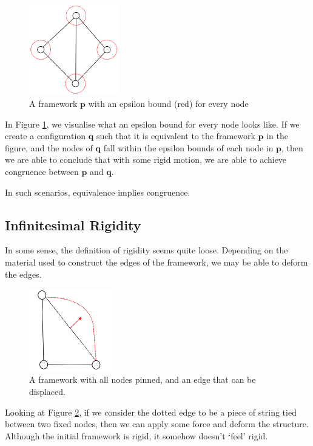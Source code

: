 \begin{figure}[htbp]
    \centering
    \includegraphics[width = 0.35\textwidth]{Chapter 2/14. epsilon.png}
    \caption{A framework $\mathbf{p}$ with an epsilon bound (red) for every node}
    \label{fig: epsilon}
\end{figure}
\vspace{-3mm}
\begin{flushleft}
In Figure \ref{fig: epsilon}, we visualise what an epsilon bound for every node looks like. If we create a configuration $\mathbf{q}$ such that it is equivalent to the framework $\mathbf{p}$ in the figure, and the nodes of $\mathbf{q}$ fall within the epsilon bounds of each node in $\mathbf{p}$, then we are able to conclude that with some rigid motion, we are able to achieve congruence between $\mathbf{p}$ and $\mathbf{q}$. 

In such scenarios, equivalence implies congruence.    
\end{flushleft}

\subsection{Infinitesimal Rigidity}

\begin{flushleft}
In some sense, the definition of rigidity seems quite loose. Depending on the material used to construct the edges of the framework, we may be able to deform the edges. 
\end{flushleft}

\begin{figure}[htbp]
    \centering
    \includegraphics[width = 0.32\textwidth]{Chapter 2/9. not_inf_rigid.png}
    \caption{A framework with all nodes pinned, and an edge that can be displaced.}
    \label{fig: not_inf_rigid}
\end{figure}
\vspace{-2 mm}
\begin{flushleft}
Looking at Figure \ref{fig: not_inf_rigid}, if we consider the dotted edge to be a piece of string tied between two fixed nodes, then we can apply some force and deform the structure. Although the initial framework is rigid, it somehow doesn't `feel' rigid.
\end{flushleft}

